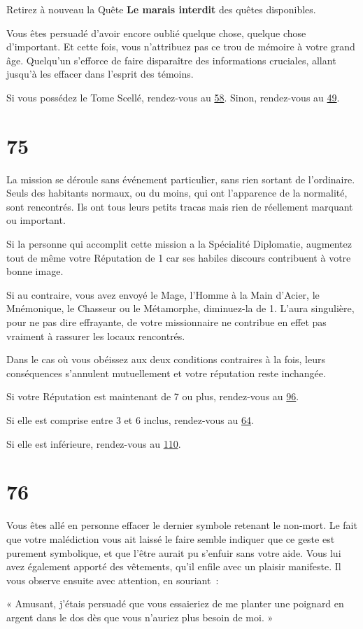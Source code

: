 \documentclass{report}
\newcommand{\gsection}[1]{
    \section{#1}
    \label{section-#1}
}
\newcommand{\glink}[1]{\hyperref[section-#1]{#1}}
\begin{document}
Retirez à nouveau la Quête \textbf{Le marais interdit} des quêtes disponibles.

Vous êtes persuadé d'avoir encore oublié quelque chose, quelque chose d'important. Et cette fois, vous n'attribuez pas ce trou de mémoire à votre grand âge. Quelqu'un s'efforce de faire disparaître des informations cruciales, allant jusqu'à les effacer dans l'esprit des témoins.

Si vous possédez le Tome Scellé, rendez-vous au \glink{58}. Sinon, rendez-vous au \glink{49}.

\gsection{75}

La mission se déroule sans événement particulier, sans rien sortant de l'ordinaire. Seuls des habitants normaux, ou du moins, qui ont l'apparence de la normalité, sont rencontrés. Ils ont tous leurs petits tracas mais rien de réellement marquant ou important.

Si la personne qui accomplit cette mission a la Spécialité Diplomatie, augmentez tout de même votre Réputation de 1 car ses habiles discours contribuent à votre bonne image.

Si au contraire, vous avez envoyé le Mage, l'Homme à la Main d'Acier, le Mnémonique, le Chasseur ou le Métamorphe, diminuez-la de 1. L'aura singulière, pour ne pas dire effrayante, de votre missionnaire ne contribue en effet pas vraiment à rassurer les locaux rencontrés.

Dans le cas où vous obéissez aux deux conditions contraires à la fois, leurs conséquences s'annulent mutuellement et votre réputation reste inchangée.

Si votre Réputation est maintenant de 7 ou plus, rendez-vous au \glink{96}.

Si elle est comprise entre 3 et 6 inclus, rendez-vous au \glink{64}.

Si elle est inférieure, rendez-vous au \glink{110}.

\gsection{76}

Vous êtes allé en personne effacer le dernier symbole retenant le non-mort. Le fait que votre malédiction vous ait laissé le faire semble indiquer que ce geste est purement symbolique, et que l'être aurait pu s'enfuir sans votre aide. Vous lui avez également apporté des vêtements, qu'il enfile avec un plaisir manifeste. Il vous observe ensuite avec attention, en souriant :

« Amusant, j'étais persuadé que vous essaieriez de me planter une poignard en argent dans le dos dès que vous n'auriez plus besoin de moi. »
\end{document}
